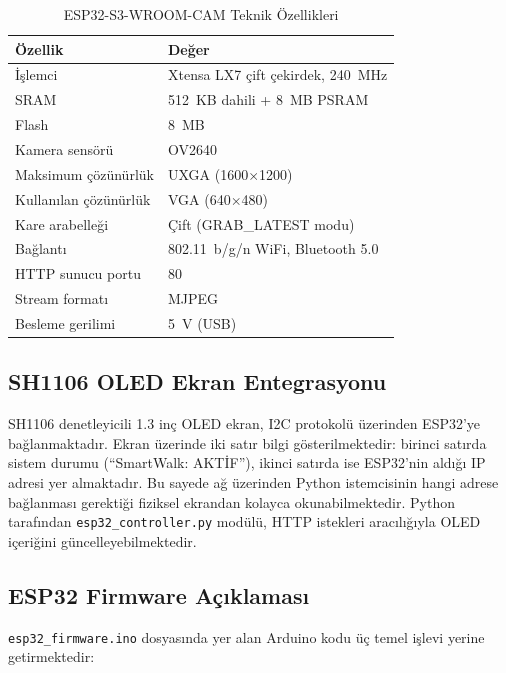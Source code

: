 \begin{table}[H]
\centering
\caption{ESP32-S3-WROOM-CAM Teknik Özellikleri}
\label{tbl:esp32}
\begin{tabular}{|l|l|}
\hline
\textbf{Özellik}          & \textbf{Değer} \\
\hline
İşlemci                   & Xtensa LX7 çift çekirdek, 240~MHz \\
\hline
SRAM                      & 512~KB dahili + 8~MB PSRAM \\
\hline
Flash                     & 8~MB \\
\hline
Kamera sensörü            & OV2640 \\
\hline
Maksimum çözünürlük       & UXGA (1600$\times$1200) \\
\hline
Kullanılan çözünürlük     & VGA (640$\times$480) \\
\hline
Kare arabelleği           & Çift (GRAB\_LATEST modu) \\
\hline
Bağlantı                  & 802.11~b/g/n WiFi, Bluetooth 5.0 \\
\hline
HTTP sunucu portu         & 80 \\
\hline
Stream formatı            & MJPEG \\
\hline
Besleme gerilimi          & 5~V (USB) \\
\hline
\end{tabular}
\end{table}

\subsection{SH1106 OLED Ekran Entegrasyonu}

SH1106 denetleyicili 1.3 inç OLED ekran, I2C protokolü üzerinden ESP32'ye bağlanmaktadır. Ekran üzerinde iki satır bilgi gösterilmektedir: birinci satırda sistem durumu (``SmartWalk: AKTİF''), ikinci satırda ise ESP32'nin aldığı IP adresi yer almaktadır. Bu sayede ağ üzerinden Python istemcisinin hangi adrese bağlanması gerektiği fiziksel ekrandan kolayca okunabilmektedir. Python tarafından \texttt{esp32\_controller.py} modülü, HTTP istekleri aracılığıyla OLED içeriğini güncelleyebilmektedir.

\subsection{ESP32 Firmware Açıklaması}

\texttt{esp32\_firmware.ino} dosyasında yer alan Arduino kodu üç temel işlevi yerine getirmektedir:

